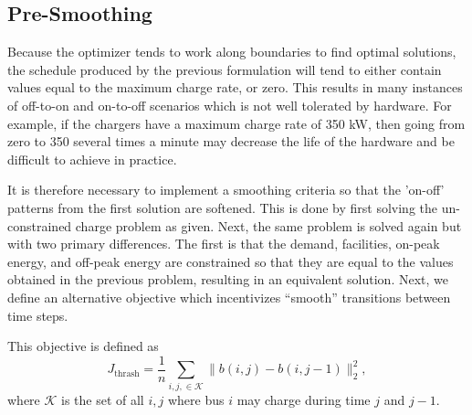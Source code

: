 \subsection{Pre-Smoothing}
Because the optimizer tends to work along boundaries to find optimal solutions, the schedule produced by the previous formulation will tend to either contain values equal to the maximum charge rate, or zero. This results in many instances of off-to-on and on-to-off scenarios which is not well tolerated by hardware.  For example, if the chargers have a maximum charge rate of 350 kW, then going from zero to 350 several times a minute may decrease the life of the hardware and be difficult to achieve in practice.
\par It is therefore necessary to implement a smoothing criteria so that the 'on-off' patterns from the first solution are softened. This is done by first solving the un-constrained charge problem as given. Next, the same problem is solved again but with two primary differences. The first is that the demand, facilities, on-peak energy, and off-peak energy are constrained so that they are equal to the values obtained in the previous problem, resulting in an equivalent solution. Next, we define an alternative objective which incentivizes ``smooth'' transitions between time steps. 
\par This objective is defined as
\begin{equation}\label{eqn:objective:smooth}
	J_{\text{thrash}} = \frac{1}{n}\sum_{i,j, \in \mathcal{K}}\lVert b(i,j) - b(i,j-1) \rVert^2_2,
\end{equation}
where $\mathcal{K}$ is the set of all $i,j$ where bus $i$ may charge during time $j$ and $j - 1$.

